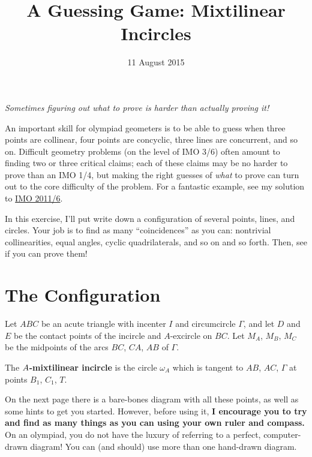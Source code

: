 \documentclass[11pt]{scrartcl}
\begin{document}
\title{A Guessing Game: Mixtilinear Incircles}
\date{11 August 2015}
\maketitle

\begin{center}
  \itshape
  Sometimes figuring out what to prove is harder than actually proving it!
\end{center}

An important skill for olympiad geometers is to be able to guess when three points are collinear,
four points are concyclic, three lines are concurrent, and so on.
Difficult geometry problems (on the level of IMO 3/6) often amount to finding two or three critical claims;
each of these claims may be no harder to prove than an IMO 1/4, but making the right guesses of \emph{what} to prove
can turn out to the core difficulty of the problem.
For a fantastic example, see my solution to
\href{http://www.aops.com/community/c6h418983p3518149}{IMO 2011/6}.

In this exercise, I'll put write down a configuration of several points, lines, and circles.
Your job is to find as many ``coincidences'' as you can: nontrivial collinearities, equal angles,
cyclic quadrilaterals, and so on and so forth.
Then, see if you can prove them!

\tableofcontents

\section{The Configuration}
\begin{mdframed}
  Let $ABC$ be an acute triangle with incenter $I$ and circumcircle $\Gamma$,
  and let $D$ and $E$ be the contact points of the incircle and $A$-excircle on $BC$.
  Let $M_A$, $M_B$, $M_C$ be the midpoints of the arcs $BC$, $CA$, $AB$ of $\Gamma$.

  The \textbf{$\boldmath A$-mixtilinear incircle} is the circle $\omega_A$ which is
  tangent to $AB$, $AC$, $\Gamma$ at points $B_1$, $C_1$, $T$.
\end{mdframed}

On the next page there is a bare-bones diagram with all these points,
as well as some hints to get you started.
However, before using it, \textbf{I encourage you to try and find as many things as you can
using your own ruler and compass.}
On an olympiad, you do not have the luxury of referring to a perfect, computer-drawn diagram!
You can (and should) use more than one hand-drawn diagram.
\end{document}
